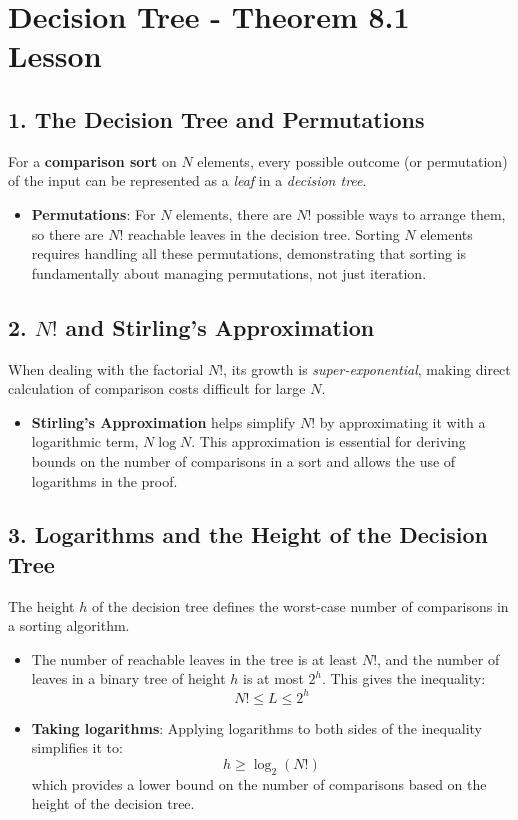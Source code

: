 \documentclass{article}
\begin{document}
\section{Decision Tree - Theorem 8.1 Lesson}

\subsection{1. The Decision Tree and Permutations}
For a \textbf{comparison sort} on \( N \) elements, every possible outcome (or permutation) of the input can be represented as a \textit{leaf} in a \textit{decision tree}.
\begin{itemize}
    \item \textbf{Permutations}: For \( N \) elements, there are \( N! \) possible ways to arrange them, so there are \( N! \) reachable leaves in the decision tree. Sorting \( N \) elements requires handling all these permutations, demonstrating that sorting is fundamentally about managing permutations, not just iteration.
\end{itemize}

\subsection{2. \( N! \) and Stirling’s Approximation}
When dealing with the factorial \( N! \), its growth is \textit{super-exponential}, making direct calculation of comparison costs difficult for large \( N \). 

\begin{itemize}
    \item \textbf{Stirling’s Approximation} helps simplify \( N! \) by approximating it with a logarithmic term, \( N \log N \). This approximation is essential for deriving bounds on the number of comparisons in a sort and allows the use of logarithms in the proof.
\end{itemize}

\subsection{3. Logarithms and the Height of the Decision Tree}
The height \( h \) of the decision tree defines the worst-case number of comparisons in a sorting algorithm.

\begin{itemize}
    \item The number of reachable leaves in the tree is at least \( N! \), and the number of leaves in a binary tree of height \( h \) is at most \( 2^h \). This gives the inequality:
    \[
    N! \leq L \leq 2^h
    \]
    \item \textbf{Taking logarithms}: Applying logarithms to both sides of the inequality simplifies it to:
    \[
    h \geq \log_2(N!)
    \]
    which provides a lower bound on the number of comparisons based on the height of the decision tree.
\end{itemize}
\end{document}
